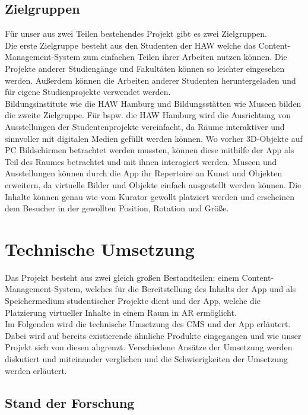 \documentclass[titlepage, a4paper, 11pt]{scrartcl}
\begin{document}
  \subsection{Zielgruppen}
  Für unser aus zwei Teilen bestehendes Projekt gibt es zwei Zielgruppen.\\
  Die erste Zielgruppe besteht aus den Studenten der HAW welche das Content-Management-System zum einfachen Teilen ihrer Arbeiten nutzen können. Die Projekte anderer Studiengänge und Fakultäten können so leichter eingesehen werden. Außerdem können die Arbeiten anderer Studenten heruntergeladen und für eigene Studienprojekte verwendet werden.\\

  Bildungsinstitute wie die HAW Hamburg und Bildungsstätten wie Museen bilden die zweite Zielgruppe. Für bspw. die HAW Hamburg wird die Ausrichtung von Ausstellungen der Studentenprojekte vereinfacht, da Räume interaktiver und sinnvoller mit digitalen Medien gefüllt werden können. Wo vorher 3D-Objekte auf PC Bildschirmen betrachtet werden mussten, können diese mithilfe der App als Teil des Raumes betrachtet und mit ihnen interagiert werden. Museen und Ausstellungen können durch die App ihr Repertoire an Kunst und Objekten erweitern, da virtuelle Bilder und Objekte einfach ausgestellt werden können. Die Inhalte können genau wie vom Kurator gewollt platziert werden und erscheinen dem Besucher in der gewollten Position, Rotation und Größe.

  \section{Technische Umsetzung}
  Das Projekt besteht aus zwei gleich großen Bestandteilen: einem Content-Management-System, welches für die Bereitstellung des Inhalts der App und als Speichermedium studentischer Projekte dient und der App, welche die Platzierung virtueller Inhalte in einem Raum in AR ermöglicht.\\
  Im Folgenden wird die technische Umsetzung des CMS und der App erläutert. Dabei wird auf bereits existierende ähnliche Produkte eingegangen und wie unser Projekt sich von diesen abgrenzt. Verschiedene Ansätze der Umsetzung werden diskutiert und miteinander verglichen und die Schwierigkeiten der Umsetzung werden erläutert.
  \subsection{Stand der Forschung}
\end{document}
